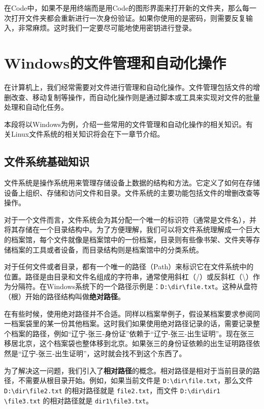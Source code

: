 \documentclass[../main.tex]{subfiles}
\begin{document}
在Code中，如果不是用终端而是用Code的图形界面来打开新的文件夹，那么每一次打开文件夹都会重新进行一次身份验证。如果你使用的是密码，则需要反复输入，非常麻烦。这时我们一定要尽可能地使用密钥进行登录。

\section{Windows的文件管理和自动化操作}\label{sec:windows-file-management}

在计算机上，我们经常需要对文件进行管理和自动化操作。文件管理包括文件的增删改查、移动复制等操作，而自动化操作则是通过脚本或工具来实现对文件的批量处理和自动化任务。

本段将以Windows为例，介绍一些常用的文件管理和自动化操作的相关知识。有关Linux文件系统的相关知识将会在下一章节介绍。

\subsection{文件系统基础知识}

文件系统是操作系统用来管理存储设备上数据的结构和方法。它定义了如何在存储设备上组织、存储和访问文件和目录。文件系统的主要功能包括文件的增删改查等操作。

对于一个文件而言，文件系统会为其分配一个唯一的标识符（通常是文件名），并将其存储在一个目录结构中。为了方便理解，我们可以将文件系统理解成一个巨大的档案馆，每个文件就像是档案馆中的一份档案，目录则有些像书架、文件夹等存储档案的工具或者设备，而目录结构则是档案馆中的分类系统。

对于任何文件或者目录，都有一个唯一的路径（Path）来标识它在文件系统中的位置。路径是由目录和文件名组成的字符串，通常使用斜杠（/）或反斜杠（\textbackslash）作为分隔符。在Windows系统下的一个路径示例是：\texttt{D:\textbackslash dir\textbackslash file.txt}。这种从盘符（根）开始的路径结构叫做\textbf{绝对路径}。

在有些时候，使用绝对路径并不合适。同样以档案举例子，假设某档案要求参阅同一档案袋里的某一份其他档案。这时我们如果使用绝对路径记录的话，需要记录整个档案的路径，例如“辽宁-张三-身份证”依赖于“辽宁-张三-出生证明”。现在张三移居北京，这个档案袋也整体移到北京。如果张三的身份证依赖的出生证明路径依然是“辽宁-张三-出生证明”，这时就会找不到这个东西了。

为了解决这一问题，我们引入了\textbf{相对路径}的概念。相对路径是相对于当前目录的路径，不需要从根目录开始。例如，如果当前文件是 \texttt{D:\textbackslash dir\textbackslash file.txt}，那么文件 \texttt{D:\textbackslash dir\textbackslash file2.txt} 的相对路径就是 \texttt{file2.txt}，而文件 \texttt{D:\textbackslash dir\textbackslash dir1 \textbackslash file3.txt} 的相对路径就是 \texttt{dir1\textbackslash file3.txt}。
\end{document}
